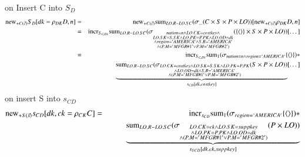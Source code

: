 \begin{comment}
\begin{eqnarray}
S_{D1} [\rho_{DK} D,n] &=& \algsum_{LO.R - LO.SC}\sigma_{\substack{C.N = n \wedge LO.CK = C.CK \\\wedge LO.SK = S.SK \\\wedge LO.PK = P.PK \wedge LO.OD = x \\\wedge C.R = 'AMERICA' \wedge S.R = 'AMERICA' \\\wedge ( P.M = 'MFGR\#1' \vee P.M = 'MFGR\#2')
}} ( C \times S \times P \times LO ))
\end{eqnarray}
\end{comment}
on Insert C into $S_{D}$
\begin{eqnarray}
\mathrm{new}_{+C(\vec{c})} S_{D} [dk = \rho_{DK}D, n] &=& \mathrm{new}_{+C(\vec{c})} \mathrm{sum}_{LO.R - LO.SC}
  ( \sigma_{\dots} ( C \times S \times P \times LO ))[\mathrm{new}_{+C(\vec{c})}\rho_{DK}D,n]\\
&=& \mathrm{incr}_{S_{C, D1}} \mathrm{sum}_{LO.R - LO.SC}
  ( \sigma_{\substack{ nation = n \wedge LO.CK = costkey \wedge\\ LO.SK = S.SK \wedge LO.PK = P.PK \wedge LO.OD = dk \\\wedge region = 'AMERICA' \wedge S.R = 'AMERICA' \\\wedge ( P.M = 'MFGR\#1' \vee P.M = 'MFGR\#2')
}} (  \{{\langle\rangle}\} \times S \times P \times LO ))[\dots]\\
&=& \mathrm{incr}_{S_{C, D1}} 
\mathrm{sum}_{1} (\sigma_{nation = n \wedge region = `AMERICA'} \{{\langle\rangle}\}) *   
\\\nonumber&& \qquad 
\underbrace{ \mathrm{sum}_{LO.R - LO.SC}( \sigma_{\substack{ LO.CK = costkey \wedge LO.SK = S.SK \wedge LO.PK = P.PK \\\wedge LO.OD = dk \wedge S.R = 'AMERICA' \\\wedge ( P.M = 'MFGR\#1' \vee P.M = 'MFGR\#2')
}} ( S \times P \times LO ))}_{s_{CD}[dk, costkey]} [\dots]\\
\end{eqnarray}
on insert S into $s_{CD}$
\begin{eqnarray}
\mathrm{new}_{+S(\vec{s})} s_{CD} [dk, ck = \rho_{CK} C] &=& 
\mathrm{incr}_{s_{CD}} 
\mathrm{sum}_{1} (\sigma_{region = `AMERICA'} \{{\langle\rangle}\}) *
\\\nonumber&&\qquad
\underbrace{\mathrm{sum}_{LO.R - LO.SC}( \sigma_{\substack{ LO.CK = ck \wedge LO.SK = suppkey \\\wedge LO.PK = P.PK \wedge LO.OD = dk  \\\wedge ( P.M = 'MFGR\#1' \vee P.M = 'MFGR\#2')
}} ( P \times LO ))}_{s_{SCD}[dk. ck, suppkey]}
\end{eqnarray}
